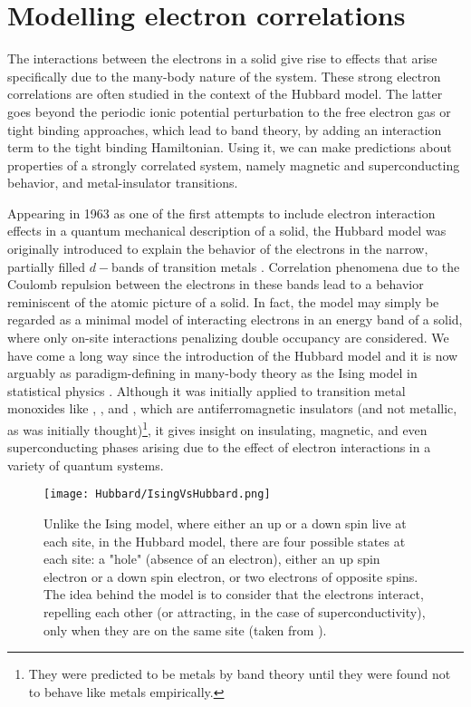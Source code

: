 \section{Modelling electron correlations}\label{sec:intro}

The interactions between the electrons in a solid give rise to effects that arise specifically due to the many-body nature of the system.
These strong electron correlations are often studied in the context of the Hubbard model.
The latter goes beyond the periodic ionic potential perturbation to the free electron gas or tight binding approaches, which lead to band theory, by adding an interaction term to the tight binding Hamiltonian. 
Using it, we can make predictions about properties of a strongly correlated system, namely magnetic and superconducting behavior, and metal-insulator transitions.

Appearing in 1963 as one of the first attempts to include electron interaction effects in a quantum mechanical description of a solid, the Hubbard model was originally introduced to explain the behavior of the electrons in the narrow, partially filled $d-$bands of transition metals \cite{hubbard_electron_1963}.
Correlation phenomena due to the Coulomb repulsion between the electrons in these bands lead to a behavior reminiscent of the atomic picture of a solid.
In fact, the model may simply be regarded as a minimal model of interacting electrons in an energy band of a solid, where only on-site interactions penalizing double occupancy are considered.
We have come a long way since the introduction of the Hubbard model and it is now arguably as paradigm-defining in many-body theory as the Ising model in statistical physics \cite{fazekas_lecture_1999, mahan_many-particle_2000, altland_condensed_2010}.
Although it was initially applied to transition metal monoxides like , , and , which are antiferromagnetic insulators (and not metallic, as was initially thought)\footnote{They were predicted to be metals by band theory until they were found not to behave like metals empirically.}, it gives insight on insulating, magnetic, and even superconducting phases arising due to the effect of electron interactions in a variety of quantum systems.

\begin{figure}[H]
	\centering
\texttt{[image: Hubbard/IsingVsHubbard.png]}
	\caption[Graphical comparison between the Ising and the Hubbard models.]{Unlike the Ising model, where either an up or a down spin live at each site, in the Hubbard model, there are four possible states at each site: a "hole" (absence of an electron), either an up spin electron or a down spin electron, or two electrons of opposite spins.
	The idea behind the model is to consider that the electrons interact, repelling each other (or attracting, in the case of superconductivity), only when they are on the same site (taken from \cite{hayes_hip-hop_2009}).}
	\label{fig:IsingVsHubbard}
\end{figure}

